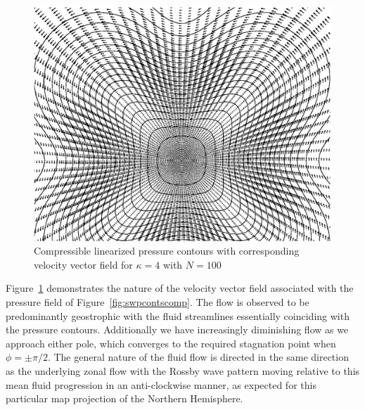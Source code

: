 \begin{figure}[htbp]
	\centering
		\includegraphics[scale=0.75]{IMAGES/pandvelfieldcomp.eps}
	\caption{Compressible linearized pressure contours with corresponding velocity vector field for $\kappa=4$ with $N=100$}
	\label{fig:pandvelfieldcomp}
\end{figure}

Figure~\ref{fig:pandvelfieldcomp} demonstrates the nature of the velocity vector field associated with the pressure field of Figure~\ref{fig:swpcontscomp}. The flow is observed to be predominantly geostrophic with the fluid streamlines essentially coinciding with the pressure contours.  Additionally we have increasingly diminishing flow as we approach either pole, which converges to the required stagnation point when $\phi=\pm \pi/2$.  The general nature of the fluid flow is directed in the same direction as the underlying zonal flow with the Rossby wave pattern moving relative to this mean fluid progression in an anti-clockwise manner, as expected for this particular map projection of the Northern Hemisphere.
